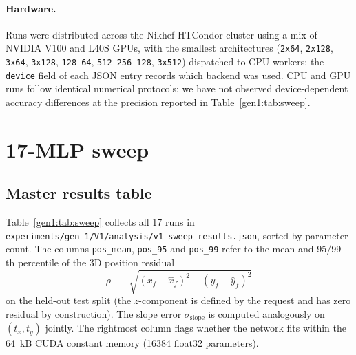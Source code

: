 \documentclass[a4paper,11pt]{article}
\newcommand{\SI}[2]{#1~#2}
\newcommand{\num}[1]{#1}
\newcommand{\kilo}{k}
\newcommand{\byte}{B}
\begin{document}
\paragraph{Hardware.} Runs were distributed across the Nikhef HTCondor
cluster using a mix of NVIDIA V100 and L40S GPUs, with the smallest
architectures (\texttt{2x64}, \texttt{2x128}, \texttt{3x64},
\texttt{3x128}, \texttt{128\_64}, \texttt{512\_256\_128}, \texttt{3x512})
dispatched to CPU workers; the \texttt{device} field of each JSON entry
records which backend was used. CPU and GPU runs follow identical
numerical protocols; we have not observed device-dependent accuracy
differences at the precision reported in Table~\ref{gen1:tab:sweep}.

\section{17-MLP sweep}\label{gen1:sec:sweep}

\subsection{Master results table}

Table~\ref{gen1:tab:sweep} collects all 17 runs in
\texttt{experiments/gen\_1/V1/analysis/v1\_sweep\_results.json}, sorted by
parameter count. The columns \texttt{pos\_mean}, \texttt{pos\_95} and
\texttt{pos\_99} refer to the mean and 95/99-th percentile of the 3D
position residual
\begin{equation}
\rho \;\equiv\; \sqrt{(x_f-\hat{x}_f)^2 + (y_f-\hat{y}_f)^2}
\label{gen1:eq:rho}
\end{equation}
on the held-out test split (the $z$-component is defined by the request
and has zero residual by construction). The slope error
$\sigma_{\text{slope}}$ is computed analogously on $(t_x,t_y)$ jointly.
The rightmost column flags whether the network fits within the
\SI{64}{\kilo\byte} CUDA constant memory (\num{16384} float32 parameters).
\end{document}
